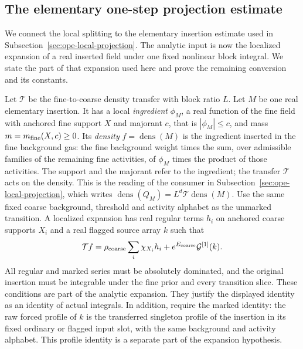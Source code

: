 \subsection{The elementary one-step projection estimate}
\label{sec:leaf-transfer}
We connect the local splitting to the elementary insertion estimate used
in Subsection~\ref{sec:ope-local-projection}. The analytic input is now the
localized expansion of a real inserted field under one fixed nonlinear
block integral. We state the part of that expansion used here and prove
the remaining conversion and its constants.

Let $\mathcal T$ be the fine-to-coarse density transfer with block ratio
$L$. Let $M$ be one real elementary insertion. It has a local
\emph{ingredient} $\phi_M$, a real function of the fine field with
anchored fine support $X$ and majorant $c$, that is
$|\phi_M|\le c$, and mass $m=m_{\rm fine}(X,c)\ge0$. Its
\emph{density} $f=\operatorname{dens}(M)$ is the ingredient inserted in
the fine background gas: the fine background weight times the sum,
over admissible families of the remaining fine activities, of
$\phi_M$ times the product of those activities. The support and the
majorant refer to the ingredient; the transfer $\mathcal T$ acts on the
density. This is the reading of the consumer in
Subsection~\ref{sec:ope-local-projection}, which writes
$\operatorname{dens}(Q_M)=L^d\mathcal T\operatorname{dens}(M)$.
Use the same fixed coarse background, threshold and activity alphabet
as the unmarked transition. A localized expansion has real regular
terms $h_i$ on anchored coarse supports $X_i$ and a real flagged
source array $k$ such that
\begin{equation}\label{eq:leaf-raw-identity}
 \mathcal T f=\rho_{\rm coarse}\sum_i\chi_{X_i}h_i
                    +e^{E_{\rm coarse}}\mathcal G^{[1]}(k).
\end{equation}
All regular and marked series must be absolutely dominated, and the
original insertion must be integrable under the fine prior and every
transition slice. These conditions are part of the analytic expansion.
They justify the displayed identity as an identity of actual integrals.
In addition, require the marked identity: the raw forced profile of $k$
is the transferred singleton profile of the insertion in its fixed ordinary
or flagged input slot, with the same background and activity alphabet.
This profile identity is a separate part of the expansion hypothesis.

